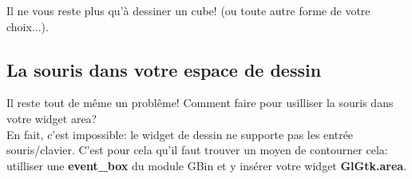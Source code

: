 Il ne vous reste plus qu'à dessiner un cube! (ou toute autre forme
de votre choix...).
\subsection{La souris dans votre espace de dessin}
	Il reste tout de même un problême! Comment faire pour
	usilliser la souris dans votre widget area?\\
	En fait, c'est impossible: le widget de dessin ne supporte
	pas les entrée souris/clavier. C'est pour cela qu'il faut
	trouver un moyen de contourner cela: utilliser une
	{\bf event\_box} du module GBin et y insérer votre widget
	{\bf GlGtk.area}.
